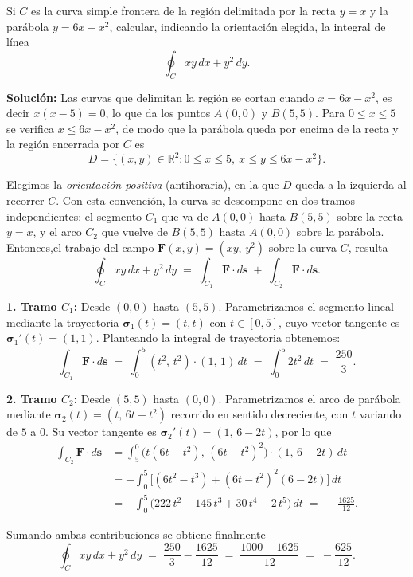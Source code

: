 \begin{example} Si $C$ es la curva simple frontera de la región delimitada por la recta $y = x$ y la parábola $y = 6x - x^2$, calcular, indicando la orientaci\'on elegida,   la integral de línea $$\displaystyle\oint_{C} xy\,dx + y^2\,dy.$$ 


\textbf{Solución:} Las curvas que delimitan la región se cortan cuando $x = 6x - x^2$, es decir $x(x-5) = 0$, lo que da los puntos $A(0,0)$ y $B(5,5)$. Para $0 \le x \le 5$ se verifica $x \le 6x - x^2$, de modo que la parábola queda por encima de la recta y la región encerrada por $C$ es
\[
D = \{(x,y)\in\mathbb{R}^2 : 0 \le x \le 5,\ x \le y \le 6x - x^2\}.
\]

\begin{center}

\end{center}

Elegimos la \emph{orientación positiva} (antihoraria), en la que $D$ queda a la izquierda al recorrer $C$. Con esta convención, la curva se descompone en dos tramos independientes: el segmento $C_1$ que va de $A(0,0)$ hasta $B(5,5)$ sobre la recta $y=x$, y el arco $C_2$ que vuelve de $B(5,5)$ hasta $A(0,0)$ sobre la parábola. Entonces,el trabajo del campo $\mathbf{F}(x,y) = (xy,\, y^2)$ sobre la curva $C$, resulta
\[
\oint_C xy\, dx + y^2\, dy \;=\; \int_{C_1} \mathbf{F}\cdot d\mathbf{s} \;+\; \int_{C_2} \mathbf{F}\cdot d\mathbf{s}.
\]

\textbf{1. Tramo $C_1$:} Desde $(0,0)$ hasta $(5,5)$.
Parametrizamos el segmento lineal mediante la trayectoria $\boldsymbol{\sigma}_1(t) = (t, t)$ con $t \in [0,5]$, cuyo vector tangente es $\boldsymbol{\sigma}_1'(t) = (1, 1)$. Planteando la integral de trayectoria obtenemos:
\[
\int_{C_1} \mathbf{F}\cdot d\mathbf{s} \;=\; \int_0^5 (t^2,\, t^2)\cdot(1,\,1)\, dt \;=\; \int_0^5 2t^2\, dt \;=\; \frac{250}{3}.
\]

\textbf{2. Tramo $C_2$:} Desde $(5,5)$ hasta $(0,0)$.
Parametrizamos el arco de parábola mediante $\boldsymbol{\sigma}_2(t) = (t,\, 6t - t^2)$ recorrido en sentido decreciente, con $t$ variando de $5$ a $0$. Su vector tangente es $\boldsymbol{\sigma}_2'(t) = (1,\, 6 - 2t)$, por lo que
\begin{align*}
\int_{C_2} \mathbf{F}\cdot d\mathbf{s} &= \int_5^0 \big(t(6t - t^2),\, (6t-t^2)^2\big)\cdot(1,\, 6-2t)\, dt \\
&= -\int_0^5 \Big[(6t^2 - t^3) + (6t - t^2)^2(6 - 2t)\Big]\, dt \\
&= -\int_0^5 \big(222\,t^2 - 145\,t^3 + 30\,t^4 - 2\,t^5\big)\, dt \;=\; -\frac{1625}{12}.
\end{align*}

Sumando ambas contribuciones se obtiene finalmente
\[
\oint_C xy\, dx + y^2\, dy \;=\; \frac{250}{3} - \frac{1625}{12} \;=\; \frac{1000 - 1625}{12} \;=\; -\frac{625}{12}.
\]
\end{example}


